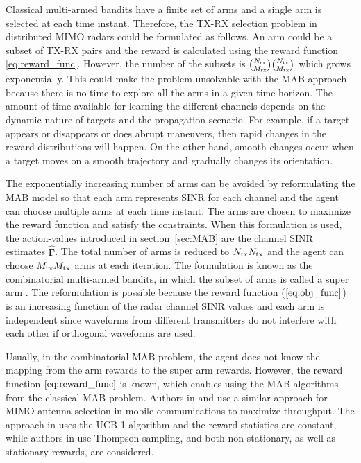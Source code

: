 \documentclass[english, 12pt, a4paper, elec, utf8, a-1b, online]{aaltothesis}
\newcommand{\vsinrb}{\widehat{\boldsymbol{\Gamma}}}
\begin{document}
Classical multi-armed bandits have a finite set of arms and a single arm is selected at each time instant.
Therefore, the TX-RX selection problem in distributed MIMO radars could be formulated as follows.
An arm could be a subset of TX-RX pairs and the reward is calculated using the reward function \eqref{eq:reward_func}.
However, the number of the subsets is $\binom{{N_{\text{rx}}}}{{M_{\text{rx}}}}\binom{{N_{\text{tx}}}}{{M_{\text{tx}}}}$ which grows exponentially. This could make the problem unsolvable with the MAB approach because there is no time to explore all the arms in a given time horizon.
The amount of time available for learning the different channels depends on the dynamic nature of targets and the propagation scenario.
For example, if a target appears or disappears or does abrupt maneuvers, then rapid changes in the reward distributions will happen. 
On the other hand, smooth changes occur when a target moves on a smooth trajectory and gradually changes its orientation.

The exponentially increasing number of arms can be avoided by reformulating the MAB model so that each arm represents SINR for each channel and the agent can choose multiple arms at each time instant.
The arms are chosen to maximize the reward function and satisfy the constraints.
When this formulation is used, the action-values introduced in section~\ref{sec:MAB} are the channel SINR estimates $\vsinrb$.
The total number of arms is reduced to ${N_{\text{rx}}}{N_{\text{tx}}}$ and the agent can choose ${M_{\text{rx}}}{M_{\text{tx}}}$ arms at each iteration.
The formulation is known as the combinatorial multi-armed bandits, in which the subset of arms is called a super arm \cite{Chen2014}.
The reformulation is possible because the reward function ($\ref{eq:obj_func}$) is an increasing function of the radar channel SINR values and each arm is independent since waveforms from different transmitters do not interfere with each other if orthogonal waveforms are used.

Usually, in the combinatorial MAB problem, the agent does not know the mapping from the arm rewards to the super arm rewards.
However, the reward function $\eqref{eq:reward_func}$ is known, which enables using the MAB algorithms from the classical MAB problem.
Authors in \cite{Mukherjee2012} and \cite{Kuai2019} use a similar approach for MIMO antenna selection in mobile communications to maximize throughput.
The approach in \cite{Mukherjee2012} uses the UCB-1 algorithm and the reward statistics are constant, while authors in \cite{Kuai2019} use Thompson sampling, and both non-stationary, as well as stationary rewards, are considered.
\end{document}
